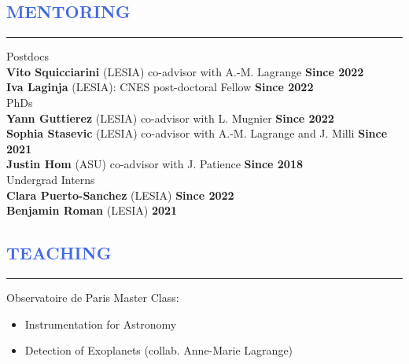 \documentclass[11pt]{article}
\begin{document}
\vspace{-0.35cm}
\textcolor{RoyalBlue}{\section{\large MENTORING}
\vspace{-0.35cm}\hrule}
\vspace{0.4cm}
Postdocs\\
{\small
\textbf{Vito Squicciarini} (LESIA) co-advisor with A.-M. Lagrange \hfill \textbf{Since 2022}\\
\textbf{Iva Laginja} (LESIA): CNES post-doctoral Fellow \hfill \textbf{Since 2022}\\
}
PhDs\\
{\small
\textbf{Yann Guttierez} (LESIA) co-advisor with L. Mugnier \hfill \textbf{Since 2022}\\
\textbf{Sophia Stasevic} (LESIA) co-advisor with A.-M. Lagrange and J. Milli \hfill \textbf{Since 2021}\\
\textbf{Justin Hom} (ASU) co-advisor with J. Patience \hfill \textbf{Since 2018}\\
}
Undergrad Interns\\
{\small
\textbf{Clara Puerto-Sanchez} (LESIA) \hfill \textbf{Since 2022}\\
\textbf{Benjamin Roman} (LESIA) \hfill \textbf{2021}\\
}

\vspace{-0.1cm}
\textcolor{RoyalBlue}{\section{\large TEACHING}
\vspace{-0.35cm}\hrule}
\vspace{0.4cm}
Observatoire de Paris Master Class: 
\begin{itemize} \itemsep -2pt
    \item Instrumentation for Astronomy 
    \item Detection of Exoplanets (collab. Anne-Marie Lagrange)
\end{itemize}



\end{document}
